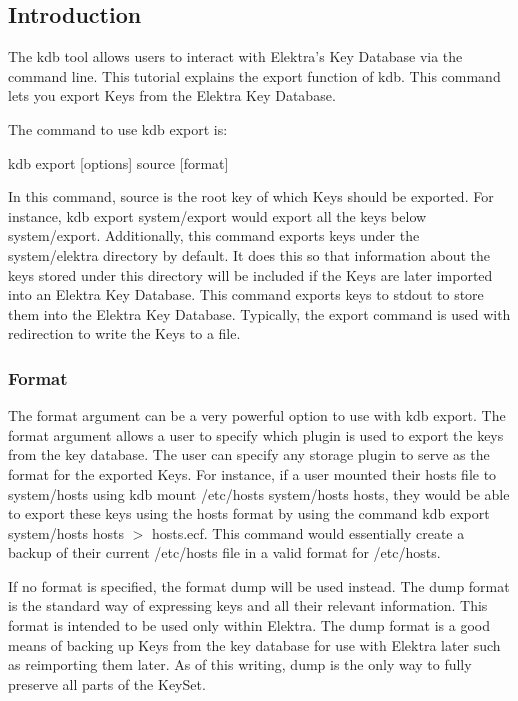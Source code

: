 \subsection*{Introduction}

The kdb tool allows users to interact with Elektra’s Key Database via the command line. This tutorial explains the export function of kdb. This command lets you export Keys from the Elektra Key Database.

The command to use kdb export is\+:


\begin{DoxyCode}
kdb export [options] source [format]
\end{DoxyCode}


In this command, source is the root key of which Keys should be exported. For instance, {\ttfamily kdb export system/export} would export all the keys below {\ttfamily system/export}. Additionally, this command exports keys under the {\ttfamily system/elektra} directory by default. It does this so that information about the keys stored under this directory will be included if the Keys are later imported into an Elektra Key Database. This command exports keys to {\ttfamily stdout} to store them into the Elektra Key Database. Typically, the export command is used with redirection to write the Keys to a file.

\subsubsection*{Format}

The format argument can be a very powerful option to use with kdb export. The format argument allows a user to specify which plugin is used to export the keys from the key database. The user can specify any storage plugin to serve as the format for the exported Keys. For instance, if a user mounted their hosts file to {\ttfamily system/hosts} using {\ttfamily kdb mount /etc/hosts system/hosts hosts}, they would be able to export these keys using the hosts format by using the command {\ttfamily kdb export system/hosts hosts $>$ hosts.\+ecf}. This command would essentially create a backup of their current {\ttfamily /etc/hosts} file in a valid format for {\ttfamily /etc/hosts}.

If no format is specified, the format {\ttfamily dump} will be used instead. The dump format is the standard way of expressing keys and all their relevant information. This format is intended to be used only within Elektra. The dump format is a good means of backing up Keys from the key database for use with Elektra later such as reimporting them later. As of this writing, {\ttfamily dump} is the only way to fully preserve all parts of the {\ttfamily Key\+Set}.

